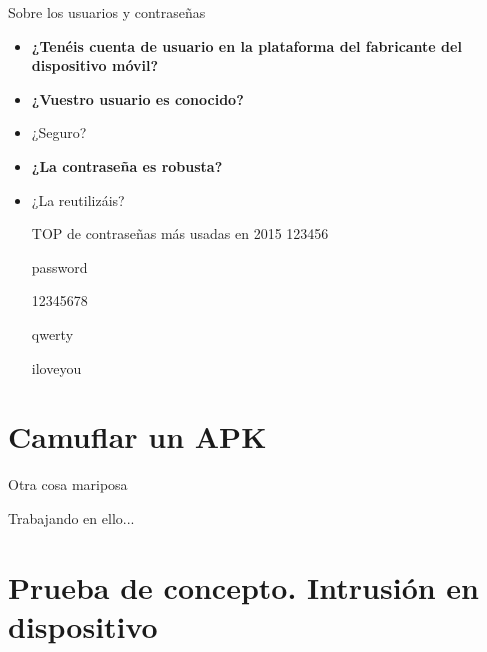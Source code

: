 \documentclass{beamer}
\begin{document}
\begin{frame}{Sobre los usuarios y contraseñas}
	
	\begin{itemize}[<+-|alert@+>]
		
		\item \textbf{¿Tenéis cuenta de usuario en la plataforma del fabricante del dispositivo móvil?}
		\item \textbf{¿Vuestro usuario es conocido?}
		\item ¿Seguro?
		\item \textbf{¿La contraseña es robusta?}
		\item ¿La reutilizáis?
		
	\begin{block}{TOP de contraseñas más usadas en 2015}
		123456
		
		password
		
		12345678
		
		qwerty
		
		iloveyou
		
	\end{block}
	
	\end{itemize}
	
\end{frame}


\section{Camuflar un APK}

\begin{frame}{Otra cosa mariposa}

Trabajando en ello...

\end{frame}


\section{Prueba de concepto. Intrusión en dispositivo}
\end{document}
